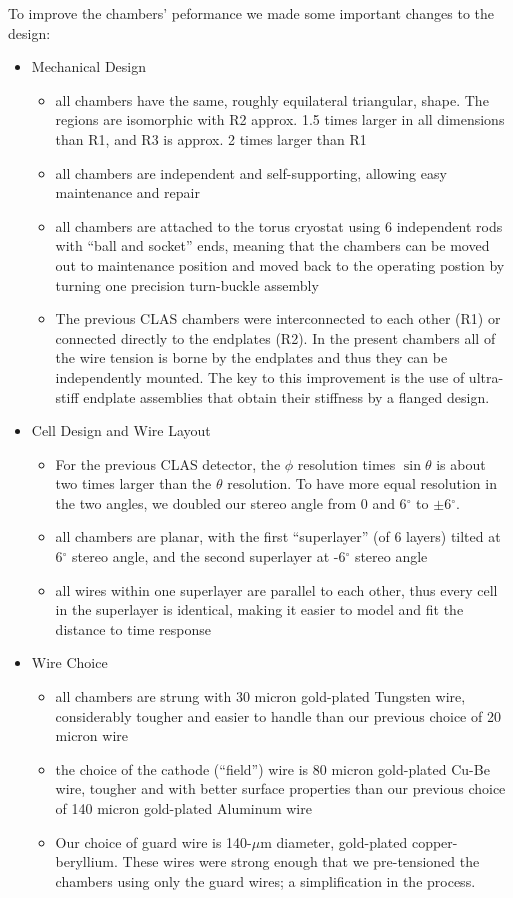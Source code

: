 To improve the chambers' peformance we made some important changes to the design:
\begin{itemize}
\item Mechanical Design
\begin{itemize}
\item all chambers have the same, roughly equilateral triangular, shape.
The regions are isomorphic with R2 approx. 1.5 times larger
in all dimensions than R1, and R3 is approx. 2 times larger than R1
\item all chambers are independent and self-supporting, allowing easy
maintenance and repair
\item all chambers are attached to the torus cryostat using 6 independent
rods with ``ball and socket'' ends, meaning that the chambers can be
moved out to maintenance position and moved back to the operating 
postion by turning one precision turn-buckle assembly
\item The previous CLAS chambers were interconnected to each other (R1) or 
connected directly to the endplates (R2).  In the present chambers all of the wire tension
is borne by the endplates and thus they can be independently mounted.
The key to this improvement is the use of  
ultra-stiff endplate assemblies that obtain their stiffness 
by a flanged design.
\end{itemize}
\item Cell Design and Wire Layout
\begin{itemize}  
\item For the previous CLAS detector, the $\phi$ resolution times $\sin \theta$ is about two 
times larger than the $\theta$ resolution.  To have more equal resolution in 
the two angles, we doubled our stereo angle from 0 and 6$^\circ$ to 
$\pm$6$^\circ$.
\item all chambers are planar, with the first ``superlayer'' (of 6 layers)
tilted at 6$^\circ$ stereo angle, and the second superlayer at -6$^\circ$ stereo
angle
\item all wires within one superlayer are parallel to each other, thus
every cell in the superlayer is identical, making it easier to model
and fit the distance to time response
\end{itemize}
\item Wire Choice
\begin{itemize}
\item all chambers are strung with 30 micron gold-plated Tungsten wire,
considerably tougher and easier to handle than our previous choice 
of 20 micron wire
\item the choice of the cathode (``field'') wire is 80 micron gold-plated
Cu-Be wire, tougher and with better surface properties than our previous
choice of 140 micron gold-plated Aluminum wire
\item  Our choice of guard wire is 140-$\mu$m diameter, gold-plated
copper-beryllium.  These wires were strong enough that we pre-tensioned 
the chambers using only the guard wires; a simplification in the process.
\end{itemize}
\end{itemize}

